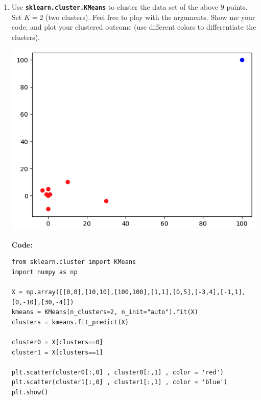 \documentclass{assignment}
\begin{document}
\begin{problem}
\begin{enumerate}
\begin{enumerate}[label=(\alph*)]
\begin{enumerate}[label=\roman*.]
        \end{enumerate}


        
        \item Use \texttt{\textbf{sklearn.cluster.KMeans}} to cluster the data set of the above 9 points. Set $K = 2$ (two clusters). Feel free to play with the arguments. Show me your code, and plot your clustered outcome (use different colors to differentiate the clusters).

        \includegraphics[scale=.5]{474-HW4-Q1.png}

        \color{blue}\textbf{Code:}
        \begin{lstlisting}
from sklearn.cluster import KMeans
import numpy as np

X = np.array([[0,0],[10,10],[100,100],[1,1],[0,5],[-3,4],[-1,1],[0,-10],[30,-4]])
kmeans = KMeans(n_clusters=2, n_init="auto").fit(X)
clusters = kmeans.fit_predict(X)

cluster0 = X[clusters==0]
cluster1 = X[clusters==1]
 
plt.scatter(cluster0[:,0] , cluster0[:,1] , color = 'red')
plt.scatter(cluster1[:,0] , cluster1[:,1] , color = 'blue')
plt.show()
        \end{lstlisting}
        \color{black}



\end{enumerate}
\end{enumerate}
\end{problem}
\end{document}
